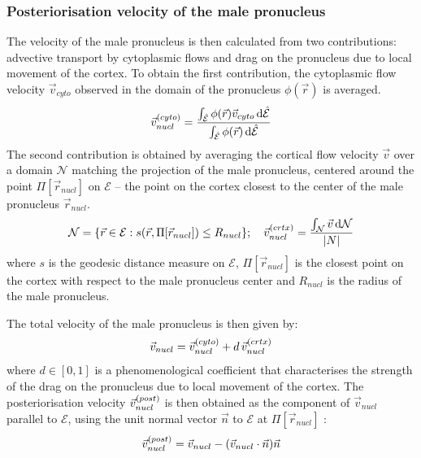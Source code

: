\subsubsection{Posteriorisation velocity of the male pronucleus}
The velocity of the male pronucleus is then calculated from two contributions: advective transport by cytoplasmic flows and drag on the pronucleus due to local movement of the cortex. To obtain the first contribution, the cytoplasmic flow velocity $\vec{v}_{cyto}$ observed in the domain of the pronucleus $\phi(\vec{r})$ is averaged. 
\begin{equation*}
    \vec{v}^{(cyto)}_{nucl} = \frac{\int_{\hat{\mathcal{E}}} \phi(\vec{r})\vec{v}_{cyto} \dd{\hat{\mathcal{E}}}}{\int_{\hat{\mathcal{E}}} \phi(\vec{r}) \dd{\hat{\mathcal{E}}}}
\end{equation*}
The second contribution is obtained by averaging the cortical flow velocity $\vec{v}$ over a domain $\mathcal{N}$ matching the projection of the male pronucleus, centered around the point $\Pi[\vec{r}_{nucl}]$ on $\mathcal{E}$ -- the point on the cortex closest to the center of the male pronucleus $\vec{r}_{nucl}$.
\begin{equation*}
    \mathcal{N} = \{\vec{r} \in \mathcal{E} : s(\vec{r},\Pi[\vec{r}_{nucl}]) \leq R_{nucl} \};\quad \vec{v}^{(crtx)}_{nucl} = \frac{\int_{\mathcal{N}} \vec{v} \dd{\mathcal{N}}}{\abs{N}}
\end{equation*}
where $s$ is the geodesic distance measure on $\mathcal{E}$, $\Pi[\vec{r}_{nucl}]$ is the closest point on the cortex with respect to the male pronucleus center and $R_{nucl}$ is the radius of the male pronucleus. 

The total velocity of the male pronucleus is then given by:
\begin{equation}\label{eq:pronucleusTransportModelMN}
    \vec{v}_{nucl} = \vec{v}^{(cyto)}_{nucl}  + d\,\vec{v}^{(crtx)}_{nucl} 
\end{equation}
where $d \in [0,1]$ is a phenomenological coefficient that characterises the strength of the drag on the pronucleus due to local movement of the cortex. The posteriorisation velocity $\vec{v}^{(post)}_{nucl}$ is then obtained as the component of $\vec{v}_{nucl}$ parallel to $\mathcal{E}$, using the unit normal vector $\vec{n}$ to $\mathcal{E}$ at $\Pi[\vec{r}_{nucl}]$  :
\begin{equation}\label{eq:pronucleusPostVelModelMN}
    \vec{v}^{(post)}_{nucl} = \vec{v}_{nucl} - (\vec{v}_{nucl}\cdot\vec{n})\vec{n}
\end{equation}

